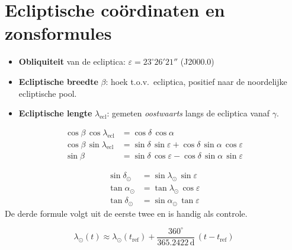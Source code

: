 \documentclass[11pt, a4paper]{article}
\newcommand{\graden}{^{\circ}}
\newcommand{\boogmin}{'}
\newcommand{\boogsec}{''}
\newcommand{\zon}{\odot}
\begin{document}
\section{Ecliptische coördinaten en zonsformules}

\begin{formule}[Definities]
\begin{itemize}[leftmargin=1.5em]
  \item \textbf{Obliquiteit} van de ecliptica: $\varepsilon = 23\graden 26\boogmin 21\boogsec$ (J2000.0)
  \item \textbf{Ecliptische breedte} $\beta$: hoek t.o.v.\ ecliptica, positief naar de noordelijke ecliptische pool.
  \item \textbf{Ecliptische lengte} $\lambda_\mathrm{ecl}$: gemeten \emph{oostwaarts} langs de ecliptica vanaf $\gamma$.
\end{itemize}
\end{formule}

\begin{formule}
\begin{align}
  \cos\beta\,\cos\lambda_\mathrm{ecl} &= \cos\delta\,\cos\alpha \\
  \cos\beta\,\sin\lambda_\mathrm{ecl} &= \sin\delta\,\sin\varepsilon + \cos\delta\,\sin\alpha\,\cos\varepsilon \\
  \sin\beta &= \sin\delta\,\cos\varepsilon - \cos\delta\,\sin\alpha\,\sin\varepsilon
\end{align}
\end{formule}

\begin{formule}[Zonsformules ($\beta_\zon = 0\graden$ exact)]
\begin{align}
  \sin\delta_\zon &= \sin\lambda_\zon\,\sin\varepsilon \\
  \tan\alpha_\zon &= \tan\lambda_\zon\,\cos\varepsilon \\
  \tan\delta_\zon &= \sin\alpha_\zon\,\tan\varepsilon
\end{align}
De derde formule volgt uit de eerste twee en is handig als controle.
\end{formule}

\begin{formule}
\[
  \lambda_\zon(t) \approx \lambda_\zon(t_\mathrm{ref}) + \frac{360\graden}{365.2422\,\mathrm{d}}\,(t - t_\mathrm{ref})
\]
\end{formule}
\end{document}
